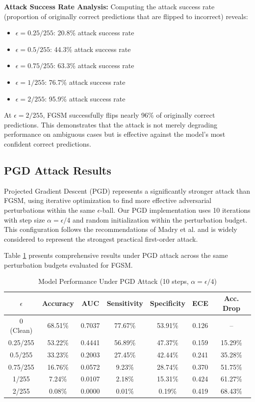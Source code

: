 \documentclass[12pt,a4paper]{article}
\begin{document}
\textbf{Attack Success Rate Analysis:} Computing the attack success rate (proportion of originally correct predictions that are flipped to incorrect) reveals:
\begin{itemize}[leftmargin=*]
    \item $\epsilon=0.25/255$: 20.8\% attack success rate
    \item $\epsilon=0.5/255$: 44.3\% attack success rate
    \item $\epsilon=0.75/255$: 63.3\% attack success rate
    \item $\epsilon=1/255$: 76.7\% attack success rate
    \item $\epsilon=2/255$: 95.9\% attack success rate
\end{itemize}

At $\epsilon=2/255$, FGSM successfully flips nearly 96\% of originally correct predictions. This demonstrates that the attack is not merely degrading performance on ambiguous cases but is effective against the model's most confident correct predictions.

\subsection{PGD Attack Results}

Projected Gradient Descent (PGD) represents a significantly stronger attack than FGSM, using iterative optimization to find more effective adversarial perturbations within the same $\epsilon$-ball. Our PGD implementation uses 10 iterations with step size $\alpha = \epsilon/4$ and random initialization within the perturbation budget. This configuration follows the recommendations of Madry et al. and is widely considered to represent the strongest practical first-order attack.

Table \ref{tab:pgd} presents comprehensive results under PGD attack across the same perturbation budgets evaluated for FGSM.

\begin{table}[H]
\centering
    \caption{Model Performance Under PGD Attack (10 steps, $\alpha=\epsilon/4$)}
    \label{tab:pgd}
\begin{tabular}{ccccccc}
\toprule
        \textbf{$\epsilon$} & \textbf{Accuracy} & \textbf{AUC} & \textbf{Sensitivity} & \textbf{Specificity} & \textbf{ECE} & \textbf{Acc. Drop} \\
\midrule
        0 (Clean) & 68.51\% & 0.7037 & 77.67\% & 53.91\% & 0.126 & -- \\
        0.25/255 & 53.22\% & 0.4441 & 56.89\% & 47.37\% & 0.159 & 15.29\% \\
        0.5/255 & 33.23\% & 0.2003 & 27.45\% & 42.44\% & 0.241 & 35.28\% \\
        0.75/255 & 16.76\% & 0.0572 & 9.23\% & 28.74\% & 0.370 & 51.75\% \\
        1/255 & 7.24\% & 0.0107 & 2.18\% & 15.31\% & 0.424 & 61.27\% \\
        2/255 & 0.08\% & 0.0000 & 0.01\% & 0.19\% & 0.419 & 68.43\% \\
\bottomrule
\end{tabular}
\end{table}
\end{document}
